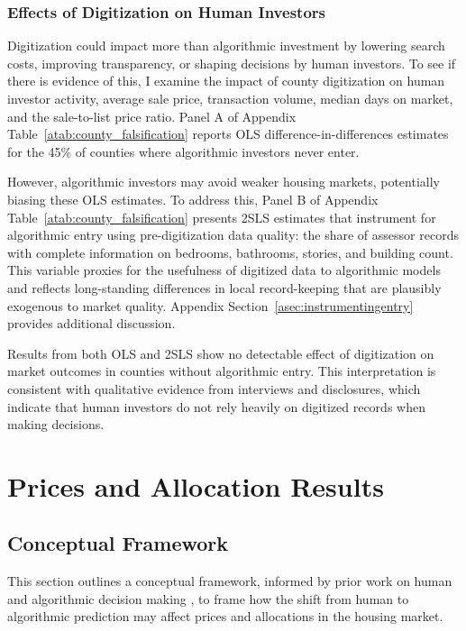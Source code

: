 \documentclass[11pt]{article}
\begin{document}
\subsubsection{Effects of Digitization on Human Investors}\label{sec:robustness:humaninvs}

Digitization could impact more than algorithmic investment by lowering search costs, improving transparency, or shaping decisions by human investors. To see if there is evidence of this, I examine the impact of county digitization on human investor activity, average sale price, transaction volume, median days on market, and the sale-to-list price ratio. Panel A of Appendix Table~\ref{atab:county_falsification} reports OLS difference-in-differences estimates for the 45\% of counties where algorithmic investors never enter. 

However, algorithmic investors may avoid weaker housing markets, potentially biasing these OLS estimates. To address this, Panel B of Appendix Table~\ref{atab:county_falsification} presents 2SLS estimates that instrument for algorithmic entry using pre-digitization data quality: the share of assessor records with complete information on bedrooms, bathrooms, stories, and building count. This variable proxies for the usefulness of digitized data to algorithmic models and reflects long-standing differences in local record-keeping that are plausibly exogenous to market quality. Appendix Section~\ref{asec:instrumentingentry} provides additional discussion.

Results from both OLS and 2SLS show no detectable effect of digitization on market outcomes in counties without algorithmic entry. This interpretation is consistent with qualitative evidence from interviews and disclosures, which indicate that human investors do not rely heavily on digitized records when making decisions.


\section{Prices and Allocation Results} \label{sec:mainresults}
\subsection{Conceptual Framework} \label{sec:conceptualframework}

This section outlines a conceptual framework, informed by prior work on human and algorithmic decision making \citep[e.g.][]{mullainathan_diagnosing_2022, kleinberg2017, rambachanIdentifyingPredictionMistakes, li_hiring_2025}, to frame how the shift from human to algorithmic prediction may affect prices and allocations in the housing market.
\end{document}
